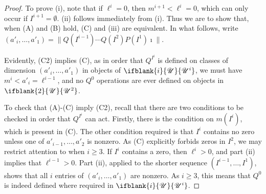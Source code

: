 \documentclass[10pt]{article}
\newcommand{\nontop}[1]{\ifblank{#1}{\scrU}{\scrU^{#1}}}
\renewcommand{\Q}{Q}
\newcommand{\SqShift}{\Sq_{\smash{+}}}
\newcommand{\Sq}{\mathrm{Sq}}
\newcommand{\minDim}{m}
\begin{document}
\begin{SequenceOfSequencesIntro}
\begin{proof}
To prove (i), note that if $\ell^i=0$, then $\minDim^{i+1}<\ell^i=0$, which can only occur if $I^{i+1}=\emptyset$. (ii) follows immediately from (i). Thus we are to show that, when \textup{(A)} and \textup{(B)} hold, \textup{(C)} and (iii) are equivalent. In what follows, write $(a'_i,\ldots,a'_1)=\|\Q(I^{i-1})\cdots \Q(I^2)P(I^1)\imath\|$.

Evidently, \textup{(C2)} implies \textup{(C)}, as in  order that $\Q^{I^i}$ is defined on classes of dimension $(a'_i,\ldots,a'_1)$ in objects of $\nontop{i}$, we must have $\minDim^i<a'_i=\ell^{i-1}$, and no $\Q^0$ operations are ever defined on objects in $\nontop{2}$.

To check that \textup{(A)}-\textup{(C)} imply \textup{(C2)}, recall that there are two conditions to be checked in order that $\Q^{I^i}$ can act. Firstly, there is the condition on $\minDim(I^i)$, which is present in \textup{(C)}. The other condition required is that $I^i$ contains no zero unless one of $a'_{i-1},\ldots,a'_{2}$ is nonzero.
As \textup{(C)} explicitly forbids zeros in $I^2$, we may restrict attention to when $i\geq3$. %
If $I^i$ contains a zero, then $\ell^i>0$, and part (ii) implies that $\ell^{i-1}>0$. Part (ii), applied to the shorter sequence $(I^{i-1},\ldots,I^1)$, shows that all $i$ entries of $(a'_i,\ldots,a'_1)$ are nonzero. As $i\geq3$, this means that $\Q^0$ is indeed defined where required in $\nontop{i}$.
%
\end{proof}


\end{SequenceOfSequencesIntro}
\end{document}
